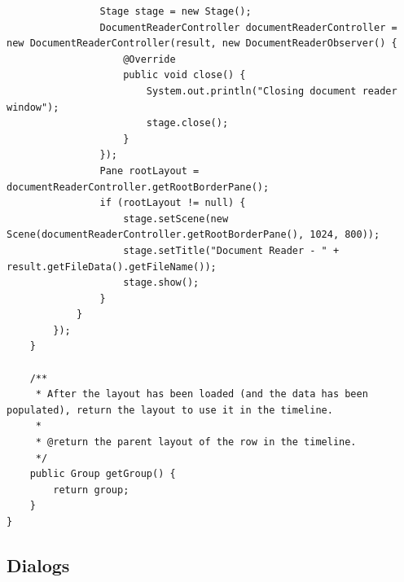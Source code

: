 \begin{lstlisting}
                Stage stage = new Stage();
                DocumentReaderController documentReaderController = new DocumentReaderController(result, new DocumentReaderObserver() {
                    @Override
                    public void close() {
                        System.out.println("Closing document reader window");
                        stage.close();
                    }
                });
                Pane rootLayout = documentReaderController.getRootBorderPane();
                if (rootLayout != null) {
                    stage.setScene(new Scene(documentReaderController.getRootBorderPane(), 1024, 800));
                    stage.setTitle("Document Reader - " + result.getFileData().getFileName());
                    stage.show();
                }
            }
        });
    }

    /**
     * After the layout has been loaded (and the data has been populated), return the layout to use it in the timeline.
     *
     * @return the parent layout of the row in the timeline.
     */
    public Group getGroup() {
        return group;
    }
}
\end{lstlisting}
\subsection{Dialogs}
